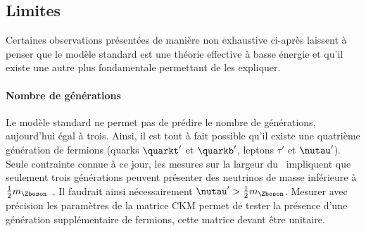 \subsection{Limites}\label{chapter-MS-MSSM-section-succes_limites-subsec-limites}
Certaines observations présentées de manière non exhaustive ci-après laissent à penser que le modèle standard est une théorie effective à basse énergie et qu'il existe une autre plus fondamentale permettant de les expliquer.
\paragraph{Nombre de générations}
Le modèle standard ne permet pas de prédire le nombre de générations, aujourd'hui égal à trois.
Ainsi, il est tout à fait possible qu'il existe une quatrième génération de fermions (quarks $\quarkt'$ et $\quarkb'$, leptons $\tau'$ et $\nutau'$).
Seule contrainte connue à ce jour, les mesures sur la largeur du \Zboson\ impliquent que seulement trois générations peuvent présenter des neutrinos de masse inférieure à $\frac{1}{2} m_{\Zboson}$~\cite{light_neutrino_number}.
Il faudrait ainsi nécessairement $\nutau' > \frac{1}{2} m_{\Zboson}$.
Mesurer avec précision les paramètres de la matrice CKM permet de tester la présence d'une génération supplémentaire de fermions, cette matrice devant être unitaire.
